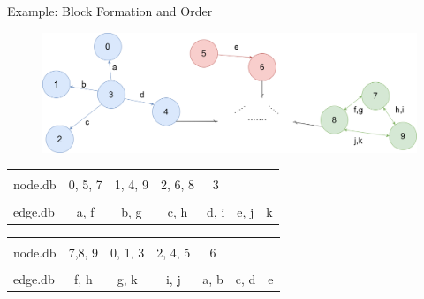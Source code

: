 \documentclass[rgb]{beamer}
\begin{document}
    \begin{frame}[fragile]{Example: Block Formation and Order}
            \begin{figure}[htp]
                \begin{center}
                    \includegraphics[keepaspectratio,height=0.4\textheight,width=\textwidth]{img/example_graph.png}
                \end{center}
            \end{figure}
            
             \begin{table}[htp]
                \centering
                \begin{tabular}[c]{|l|c|c|c|c|c|c|} \hline
                &&&&&&\\[-1em]
                node.db & \colorbox{blue!30}{0}, \colorbox{red!30}{5}, \colorbox{green!30}{7} & \colorbox{blue!30}{1}, \colorbox{blue!30}{4}, \colorbox{green!30}{9} & \colorbox{blue!30}{2}, \colorbox{red!30}{6}, \colorbox{green!30}{8} & \colorbox{blue!30}{3} &  & \\ \hline
                &&&&&&\\[-1em]
                edge.db & \colorbox{blue!30}{a}, \colorbox{green!30}{f} & \colorbox{blue!30}{b}, \colorbox{green!30}{g} & \colorbox{blue!30}{c}, \colorbox{green!30}{h} & \colorbox{blue!30}{d}, \colorbox{green!30}{i} & \colorbox{red!30}{e}, \colorbox{green!30}{j} & \colorbox{green!30}{k} \\  \hline
                \end{tabular}
                \vspace{0.5cm}
                
                \begin{tabular}{|l | c | c | c | c | c | c|} \hline
                &&&&&&\\[-1em]
                node.db & \colorbox{green!30}{7},\colorbox{green!30}{8}, \colorbox{green!30}{9} & \colorbox{blue!30}{0}, \colorbox{blue!30}{1}, \colorbox{blue!30}{3} & \colorbox{blue!30}{2}, \colorbox{blue!30}{4}, \colorbox{red!30}{5} & \colorbox{red!30}{6} &  & \\ \hline
                &&&&&&\\[-1em]
                 edge.db &  \colorbox{green!30}{f}, \colorbox{green!30}{h} & \colorbox{green!30}{g}, \colorbox{green!30}{k} & \colorbox{green!30}{i}, \colorbox{green!30}{j} & \colorbox{blue!30}{a}, \colorbox{blue!30}{b} & \colorbox{blue!30}{c}, \colorbox{blue!30}{d} & \colorbox{red!30}{e} \\ \hline
                \end{tabular}
            \end{table}
        \end{frame}       
        
\end{document}
